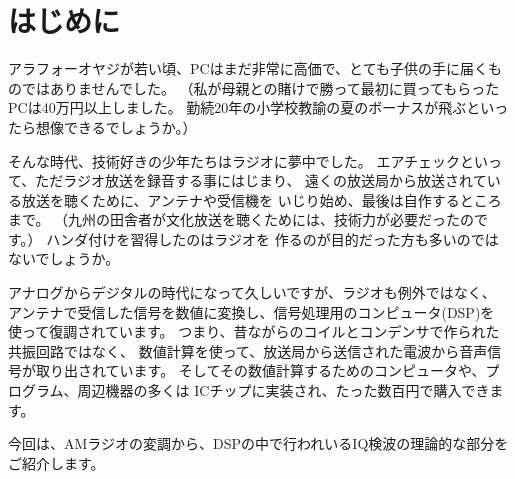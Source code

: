 \chapter*{はじめに}

アラフォーオヤジが若い頃、PCはまだ非常に高価で、とても子供の手に届くものではありませんでした。
（私が母親との賭けで勝って最初に買ってもらったPCは40万円以上しました。
勤続20年の小学校教諭の夏のボーナスが飛ぶといったら想像できるでしょうか。）

そんな時代、技術好きの少年たちはラジオに夢中でした。
エアチェックといって、ただラジオ放送を録音する事にはじまり、
遠くの放送局から放送されている放送を聴くために、アンテナや受信機を
いじり始め、最後は自作するところまで。
（九州の田舎者が文化放送を聴くためには、技術力が必要だったのです。）
ハンダ付けを習得したのはラジオを
作るのが目的だった方も多いのではないでしょうか。

アナログからデジタルの時代になって久しいですが、ラジオも例外ではなく、
アンテナで受信した信号を数値に変換し、信号処理用のコンピュータ(DSP)を
使って復調されています。
つまり、昔ながらのコイルとコンデンサで作られた共振回路ではなく、
数値計算を使って、放送局から送信された電波から音声信号が取り出されています。
そしてその数値計算するためのコンピュータや、プログラム、周辺機器の多くは
ICチップに実装され、たった数百円で購入できます。

今回は、AMラジオの変調から、DSPの中で行われいるIQ検波の理論的な部分をご紹介します。


